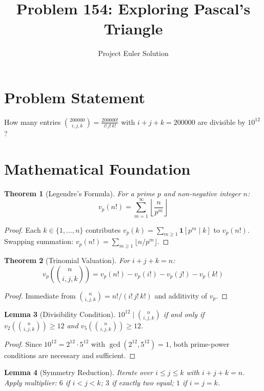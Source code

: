 \documentclass[12pt]{article}
\title{Problem 154: Exploring Pascal's Triangle}
\author{Project Euler Solution}
\date{}
\newtheorem{theorem}{Theorem}
\newtheorem{lemma}[theorem]{Lemma}
\begin{document}
\maketitle

\section{Problem Statement}
How many entries $\binom{200000}{i,j,k} = \frac{200000!}{i!\,j!\,k!}$ with $i+j+k=200000$ are divisible by $10^{12}$?

\section{Mathematical Foundation}

\begin{theorem}[Legendre's Formula]
For a prime $p$ and non-negative integer $n$:
\[
v_p(n!) = \sum_{m=1}^{\infty} \left\lfloor \frac{n}{p^m} \right\rfloor
\]
\end{theorem}

\begin{proof}
Each $k \in \{1, \ldots, n\}$ contributes $v_p(k) = \sum_{m \ge 1} \mathbf{1}[p^m \mid k]$ to $v_p(n!)$. Swapping summation: $v_p(n!) = \sum_{m \ge 1} \lfloor n / p^m \rfloor$.
\end{proof}

\begin{theorem}[Trinomial Valuation]
For $i + j + k = n$:
\[
v_p\!\left(\binom{n}{i,j,k}\right) = v_p(n!) - v_p(i!) - v_p(j!) - v_p(k!)
\]
\end{theorem}

\begin{proof}
Immediate from $\binom{n}{i,j,k} = n!/(i!\,j!\,k!)$ and additivity of $v_p$.
\end{proof}

\begin{lemma}[Divisibility Condition]
$10^{12} \mid \binom{n}{i,j,k}$ if and only if $v_2\!\left(\binom{n}{i,j,k}\right) \ge 12$ and $v_5\!\left(\binom{n}{i,j,k}\right) \ge 12$.
\end{lemma}

\begin{proof}
Since $10^{12} = 2^{12} \cdot 5^{12}$ with $\gcd(2^{12}, 5^{12}) = 1$, both prime-power conditions are necessary and sufficient.
\end{proof}

\begin{lemma}[Symmetry Reduction]
Iterate over $i \le j \le k$ with $i+j+k = n$. Apply multiplier: $6$ if $i < j < k$; $3$ if exactly two equal; $1$ if $i = j = k$.
\end{lemma}
\end{document}
